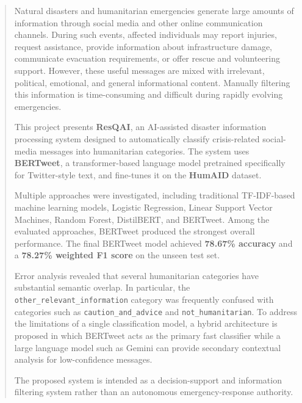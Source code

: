 \documentclass[12pt,a4paper]{article}
\begin{document}
\begin{abstract}

Natural disasters and humanitarian emergencies generate large amounts of
information through social media and other online communication channels.
During such events, affected individuals may report injuries, request
assistance, provide information about infrastructure damage, communicate
evacuation requirements, or offer rescue and volunteering support. However,
these useful messages are mixed with irrelevant, political, emotional, and
general informational content. Manually filtering this information is
time-consuming and difficult during rapidly evolving emergencies.

This project presents \textbf{ResQAI}, an AI-assisted disaster information
processing system designed to automatically classify crisis-related
social-media messages into humanitarian categories. The system uses
\textbf{BERTweet}, a transformer-based language model pretrained specifically
for Twitter-style text, and fine-tunes it on the \textbf{HumAID} dataset.

Multiple approaches were investigated, including traditional TF-IDF-based
machine learning models, Logistic Regression, Linear Support Vector Machines,
Random Forest, DistilBERT, and BERTweet. Among the evaluated approaches,
BERTweet produced the strongest overall performance. The final BERTweet model
achieved \textbf{78.67\% accuracy} and a \textbf{78.27\% weighted F1 score}
on the unseen test set.

Error analysis revealed that several humanitarian categories have substantial
semantic overlap. In particular, the
\texttt{other\_relevant\_information} category was frequently confused with
categories such as \texttt{caution\_and\_advice} and
\texttt{not\_humanitarian}. To address the limitations of a single
classification model, a hybrid architecture is proposed in which BERTweet
acts as the primary fast classifier while a large language model such as
Gemini can provide secondary contextual analysis for low-confidence messages.

The proposed system is intended as a decision-support and information
filtering system rather than an autonomous emergency-response authority.

\end{abstract}

\newpage
\end{document}
